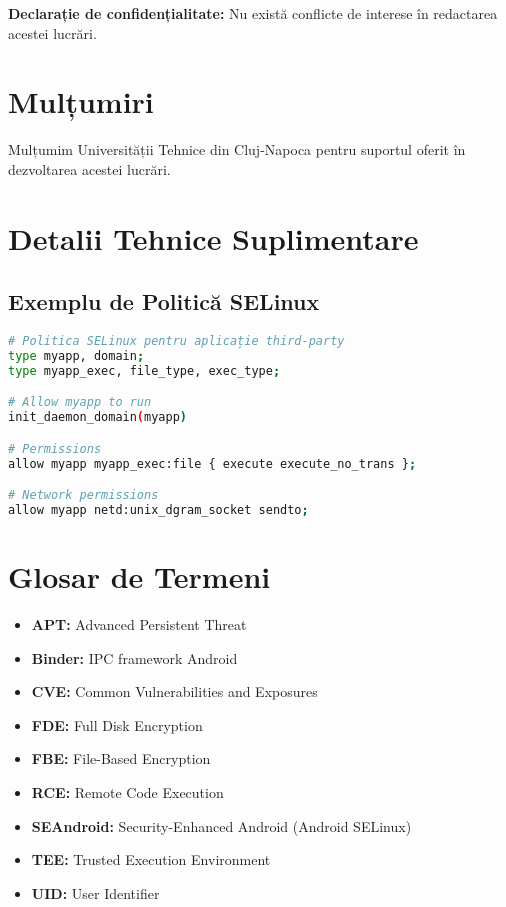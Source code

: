 \documentclass[11pt,a4paper,twocolumn]{article}
\theoremstyle{definition}
\theoremstyle{plain}
\theoremstyle{remark}
\begin{document}
\textbf{Declarație de confidențialitate:} Nu există conflicte de interese în redactarea acestei lucrări.

\section*{Mulțumiri}

Mulțumim Universității Tehnice din Cluj-Napoca pentru suportul oferit în dezvoltarea acestei lucrări.

\printbibliography

\appendix

\section{Detalii Tehnice Suplimentare}

\subsection{Exemplu de Politică SELinux}

\begin{lstlisting}[language=bash, basicstyle=\ttfamily\tiny]
# Politica SELinux pentru aplicație third-party
type myapp, domain;
type myapp_exec, file_type, exec_type;

# Allow myapp to run
init_daemon_domain(myapp)

# Permissions
allow myapp myapp_exec:file { execute execute_no_trans };

# Network permissions
allow myapp netd:unix_dgram_socket sendto;
\end{lstlisting}

\section{Glosar de Termeni}

\begin{itemize}
    \item \textbf{APT:} Advanced Persistent Threat
    \item \textbf{Binder:} IPC framework Android
    \item \textbf{CVE:} Common Vulnerabilities and Exposures
    \item \textbf{FDE:} Full Disk Encryption
    \item \textbf{FBE:} File-Based Encryption
    \item \textbf{RCE:} Remote Code Execution
    \item \textbf{SEAndroid:} Security-Enhanced Android (Android SELinux)
    \item \textbf{TEE:} Trusted Execution Environment
    \item \textbf{UID:} User Identifier
\end{itemize}
\end{document}
